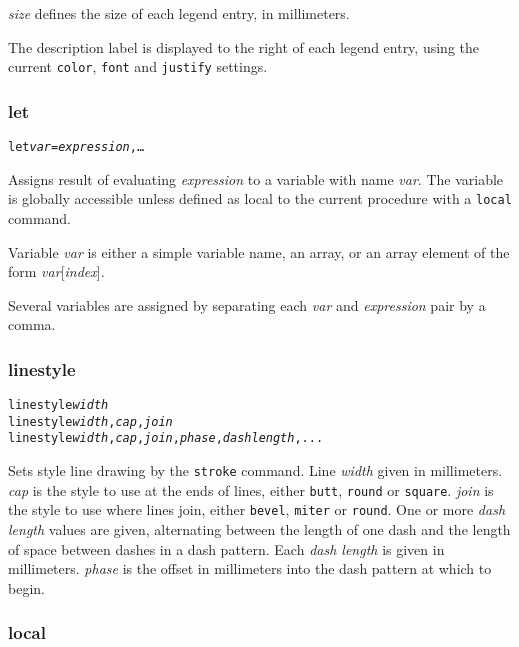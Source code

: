 \textit{size} defines the size of each legend entry, in millimeters.

The description label is displayed to the right of each legend entry, using the
current \texttt{color}, \texttt{font} and \texttt{justify} settings.

\subsubsection{let}

\begin{alltt}
let \textit{var} = \textit{expression}, \dots
\end{alltt}

Assigns result of evaluating \textit{expression} to a variable with name
\textit{var}.  The variable is globally accessible unless defined as local to
the current procedure with a \texttt{local} command.

Variable \textit{var} is either a simple variable name, an array, or an array
element of the form \textit{var}[\textit{index}].

Several variables are assigned by separating each 
\textit{var} and \textit{expression} pair by a comma.

\subsubsection{linestyle}

\begin{alltt}
linestyle \textit{width}
linestyle \textit{width}, \textit{cap}, \textit{join}
linestyle \textit{width}, \textit{cap}, \textit{join}, \textit{phase}, \textit{dash length}, ...
\end{alltt}

Sets style line drawing by the \texttt{stroke}
command.
Line \textit{width} given in millimeters.
\textit{cap} is the style to use at the ends of lines, either
\texttt{butt}, \texttt{round} or \texttt{square}.
\textit{join} is the style to use where lines join, either
\texttt{bevel}, \texttt{miter} or \texttt{round}.
One or more \textit{dash length} values are given, alternating
between the length of one dash and the length of space between
dashes in a dash pattern.  Each \textit{dash length} is given in millimeters.
\textit{phase} is the offset in millimeters into the dash pattern 
at which to begin.

\subsubsection{local}

